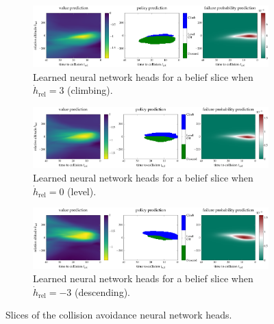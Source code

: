 \begin{figure}[p!]
    \centering
    \begin{subfigure}[t]{\linewidth}
        \centering
        \includegraphics[width=\linewidth]{figures/constrainedzero/results/cas-climb.pdf}
        \caption{Learned neural network heads for a belief slice when $\dot{h}_\text{rel}=3$ (climbing).}
        \label{fig:cas_climb}
    \end{subfigure}

    \vspace*{1cm} %

    \begin{subfigure}[t]{\linewidth}
        \centering
        \includegraphics[width=\linewidth]{figures/constrainedzero/results/cas-level.pdf}
        \caption{Learned neural network heads for a belief slice when $\dot{h}_\text{rel}=0$ (level).}
        \label{fig:cas_level}
    \end{subfigure}

    \vspace*{1cm} %

    \begin{subfigure}[t]{\linewidth}
        \centering
        \includegraphics[width=\linewidth]{figures/constrainedzero/results/cas-descend.pdf}
        \caption{Learned neural network heads for a belief slice when $\dot{h}_\text{rel}=-3$ (descending).}
        \label{fig:cas_descend}
    \end{subfigure}
    \caption{Slices of the collision avoidance neural network heads.}
    \label{fig:cas_nn}
\end{figure}


